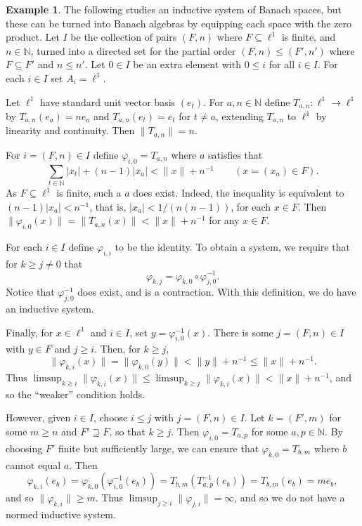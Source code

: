 \documentclass[a4paper,11pt]{article}
\theoremstyle{definition}
\newtheorem{example}[lemma]{Example}
\begin{document}
\begin{example}
The following studies an inductive system of Banach spaces, but these can be turned into Banach
algebras by equipping each space with the zero product.  Let $I$ be the collection of pairs
$(F,n)$ where $F\subseteq\ell^1$ is finite, and $n\in\mathbb N$, turned into a directed set for the
partial order $(F,n) \leq (F',n')$ where $F\subseteq F'$ and $n\leq n'$.  Let $0\in I$ be an extra
element with $0\leq i$ for all $i\in I$.  For each $i\in I$ set $A_i = \ell^1$.

Let $\ell^1$ have standard unit vector basis $(e_t)$.  For $a,n\in\mathbb N$ define $T_{a,n}:
\ell^1\rightarrow\ell^1$ by $T_{a,n}(e_a) = n e_a$ and $T_{a,n}(e_t) = e_t$ for $t\not=a$, extending
$T_{a,n}$ to $\ell^1$ by linearity and continuity.  Then $\|T_{a,n}\| = n$.

For $i=(F,n)\in I$ define $\varphi_{i,0} = T_{a,n}$ where $a$ satisfies that
\[ \sum_{t\in\mathbb N} |x_t| + (n-1)|x_a| < \|x\|+n^{-1} \qquad (x=(x_n) \in F). \]
As $F\subseteq \ell^1$ is finite, such a $a$ does exist.  Indeed, the inequality is equivalent to
$(n-1)|x_a| < n^{-1}$, that is, $|x_a| < 1/(n(n-1))$, for each $x\in F$.
Then $\|\varphi_{i,0}(x)\| = \|T_{a,n}(x)\| < \|x\|+n^{-1}$ for any $x\in F$. 

For each $i\in I$ define $\varphi_{i,i}$ to be the identity.  To obtain a system, we require that
for $k\geq j\not=0$ that
\[ \varphi_{k,j} = \varphi_{k,0} \circ \varphi_{j,0}^{-1}. \]
Notice that $\varphi_{j,0}^{-1}$ does exist, and is a contraction.  With this definition, we do
have an inductive system.

Finally, for $x\in\ell^1$ and $i\in I$, set $y=\varphi_{i,0}^{-1}(x)$.  There is some $j=(F,n)\in I$
with $y\in F$ and $j\geq i$.  Then, for $k\geq j$,
\[ \|\varphi_{k,i}(x)\| = \|\varphi_{k,0}(y)\| < \|y\|+n^{-1} \leq \|x\| + n^{-1}. \]
Thus $\limsup_{k\geq i} \|\varphi_{k,i}(x)\| \leq \limsup_{k\geq j} \|\varphi_{k,i}(x)\|
< \|x\| + n^{-1}$, and so the ``weaker'' condition holds.

However, given $i\in I$, choose $i\leq j$ with $j=(F,n)\in I$.  Let $k=(F',m)$ for some $m\geq n$
and $F'\supseteq F$, so that $k\geq j$.  Then $\varphi_{i,0} = T_{a,p}$ for some $a,p\in\mathbb N$.
By choosing $F'$ finite but sufficiently large, we can ensure that $\varphi_{k,0} = T_{b,m}$ where
$b$ cannot equal $a$.  Then
\[ \varphi_{k,i}(e_b) = \varphi_{k,0}( \varphi_{i,0}^{-1}(e_b) )
= T_{b,m}( T_{a,p}^{-1}(e_b) )
= T_{b,m}(e_b)
= m e_b, \]
and so $\|\varphi_{k,i}\|\geq m$.  Thus $\limsup_{j\geq i} \|\varphi_{j,i}\| =\infty$, and
so we do not have a normed inductive system.
\end{example}
\end{document}
